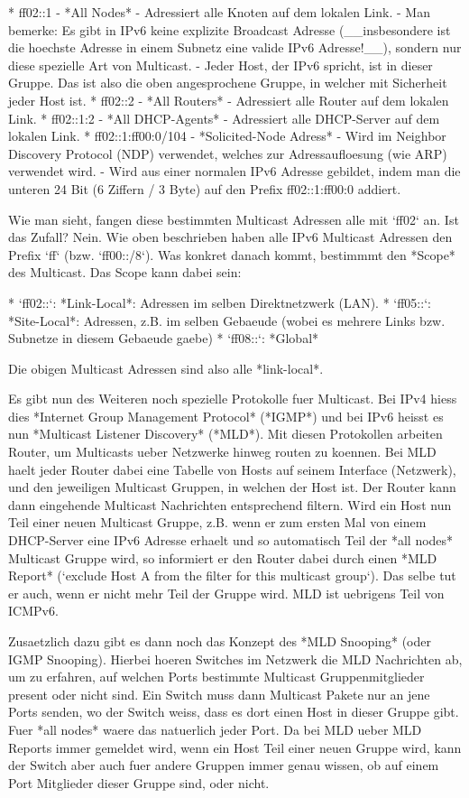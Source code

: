 * ff02::1 - *All Nodes*
  - Adressiert alle Knoten auf dem lokalen Link.
  - Man bemerke: Es gibt in IPv6 keine explizite Broadcast Adresse
    (\_\_insbesondere ist die hoechste Adresse in einem Subnetz eine valide IPv6
    Adresse!\_\_), sondern nur diese spezielle Art von Multicast.
  - Jeder Host, der IPv6 spricht, ist in dieser Gruppe. Das ist also die oben
    angesprochene Gruppe, in welcher mit Sicherheit jeder Host ist.
* ff02::2 - *All Routers*
  - Adressiert alle Router auf dem lokalen Link.
* ff02::1:2 - *All DHCP-Agents*
  - Adressiert alle DHCP-Server auf dem lokalen Link.
* ff02::1:ff00:0/104 - *Solicited-Node Adress*
  - Wird im Neighbor Discovery Protocol (NDP) verwendet, welches zur
    Adressaufloesung (wie ARP) verwendet wird.
  - Wird aus einer normalen IPv6 Adresse gebildet, indem man die unteren 24 Bit
    (6 Ziffern / 3 Byte) auf den Prefix ff02::1:ff00:0 addiert.

Wie man sieht, fangen diese bestimmten Multicast Adressen alle mit `ff02`
an. Ist das Zufall? Nein. Wie oben beschrieben haben alle IPv6 Multicast
Adressen den Prefix `ff` (bzw. `ff00::/8`). Was konkret danach kommt, bestimmmt
den *Scope* des Multicast. Das Scope kann dabei sein:

* `ff02::`: *Link-Local*: Adressen im selben Direktnetzwerk (LAN).
* `ff05::`: *Site-Local*: Adressen, z.B. im selben Gebaeude (wobei es mehrere
  Links bzw. Subnetze in diesem Gebaeude gaebe)
* `ff08::`: *Global*

Die obigen Multicast Adressen sind also alle *link-local*.

Es gibt nun des Weiteren noch spezielle Protokolle fuer Multicast. Bei IPv4
hiess dies *Internet Group Management Protocol* (*IGMP*) und bei IPv6 heisst es
nun *Multicast Listener Discovery* (*MLD*). Mit diesen Protokollen arbeiten
Router, um Multicasts ueber Netzwerke hinweg routen zu koennen. Bei MLD haelt
jeder Router dabei eine Tabelle von Hosts auf seinem Interface (Netzwerk), und
den jeweiligen Multicast Gruppen, in welchen der Host ist. Der Router kann dann
eingehende Multicast Nachrichten entsprechend filtern. Wird ein Host nun Teil
einer neuen Multicast Gruppe, z.B. wenn er zum ersten Mal von einem DHCP-Server
eine IPv6 Adresse erhaelt und so automatisch Teil der *all nodes* Multicast
Gruppe wird, so informiert er den Router dabei durch einen *MLD Report*
(`exclude Host A from the filter for this multicast group`). Das selbe tut er
auch, wenn er nicht mehr Teil der Gruppe wird. MLD ist uebrigens Teil von
ICMPv6.

Zusaetzlich dazu gibt es dann noch das Konzept des *MLD Snooping* (oder IGMP
Snooping). Hierbei hoeren Switches im Netzwerk die MLD Nachrichten ab, um zu
erfahren, auf welchen Ports bestimmte Multicast Gruppenmitglieder present oder
nicht sind. Ein Switch muss dann Multicast Pakete nur an jene Ports senden, wo
der Switch weiss, dass es dort einen Host in dieser Gruppe gibt. Fuer *all
nodes* waere das natuerlich jeder Port. Da bei MLD ueber MLD Reports immer
gemeldet wird, wenn ein Host Teil einer neuen Gruppe wird, kann der Switch aber
auch fuer andere Gruppen immer genau wissen, ob auf einem Port Mitglieder dieser
Gruppe sind, oder nicht.

